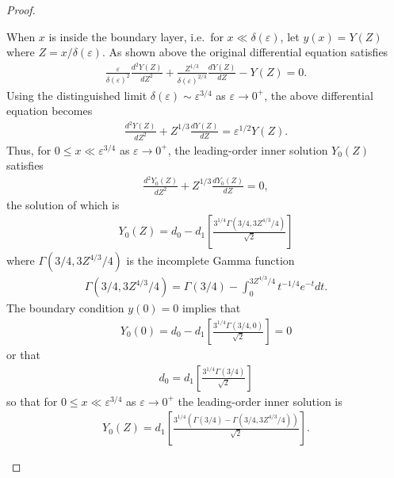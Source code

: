 \documentclass[12pt]{article}
\theoremstyle{definition}
\begin{document}
\begin{proof}
\begin{enumerate}
      When $x$ is inside the boundary layer, i.e.\ for
      $x \ll \delta(\varepsilon)$, let $y(x) = Y(Z)$ where $Z = x / \delta(\varepsilon)$.
      As shown above the original differential equation satisfies
      \begin{align*}
        \frac{\varepsilon}{\delta(\varepsilon)^2} \frac{d^2Y(Z)}{dZ^2} + \frac{Z^{1/3}}{\delta(\varepsilon)^{2/3}}\frac{dY(Z)}{dZ} - Y(Z) = 0.
      \end{align*}
      Using the distinguished limit $\delta(\varepsilon) \sim \varepsilon^{3/4}$
      as $\varepsilon \to 0^+$, the above differential equation becomes
      \begin{align*}
        \frac{d^2Y(Z)}{dZ^2} + Z^{1/3}\frac{dY(Z)}{dZ} = \varepsilon^{1/2}Y(Z).
      \end{align*}
      Thus, for $0 \leq x \ll \varepsilon^{3/4}$ as $\varepsilon \to 0^+$, the
      leading-order inner solution $Y_0(Z)$ satisfies
      \begin{align*}
        \frac{d^2Y_0(Z)}{dZ^2} + Z^{1/3}\frac{dY_0(Z)}{dZ} = 0,
      \end{align*}
      the solution of which is
      \begin{align*}
        Y_0(Z) = d_0 - d_1\left[\frac{3^{1/4}\Gamma(3/4, 3Z^{4/3}/4)}{\sqrt{2}}\right]
      \end{align*}
      where $\Gamma(3/4, 3Z^{4/3}/4)$ is the incomplete Gamma function
      \begin{align*}
        \Gamma(3/4, 3Z^{4/3}/4) = \Gamma(3/4) - \int_0^{3Z^{4/3}/4} t^{-1/4} e^{-t}dt.
      \end{align*}
      The boundary condition $y(0) = 0$ implies that
      \begin{align*}
        Y_0(0) = d_0 - d_1\left[\frac{3^{1/4}\Gamma(3/4, 0)}{\sqrt{2}}\right] = 0
      \end{align*}
      or that
      \begin{align*}
        d_0 = d_1\left[\frac{3^{1/4}\Gamma(3/4)}{\sqrt{2}}\right]
      \end{align*}
      so that for $0 \leq x \ll \varepsilon^{3/4}$ as $\varepsilon \to 0^+$ the leading-order
      inner solution is
      \begin{align*}
        Y_0(Z) = d_1\left[\frac{3^{1/4}\left(\Gamma(3/4) - \Gamma(3/4, 3Z^{4/3}/4)\right)}{\sqrt{2}}\right].
      \end{align*}


\end{enumerate}
\end{proof}
\end{document}
